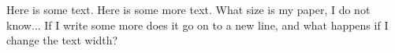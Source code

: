 \documentclass{fancycv}
\begin{document}
Here is some text. Here is some more text. What size is my paper, I do not know... If I write some more does it go on to a new line, and what happens if I change the text width?
\end{document}
